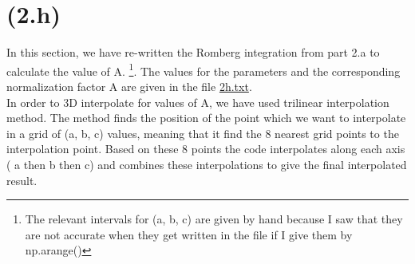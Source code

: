 \section{(2.h)}
In this section, we have re-written the Romberg integration from part 2.a to calculate the value of A. \footnote{The relevant intervals for (a, b, c) are given by hand because I saw that they are not accurate when they get written in the file if I give them by np.arange()}. The values for the parameters and the corresponding normalization factor A are given in the file \url{2h.txt}.\\
In order to 3D interpolate for values of A, we have used trilinear interpolation method. The method finds the position of the point which we want to interpolate in a grid of (a, b, c) values, meaning that it find the 8 nearest grid points to the interpolation point. Based on these 8 points the code interpolates along each axis ( a then b then c) and combines these interpolations to give the final interpolated result. 


